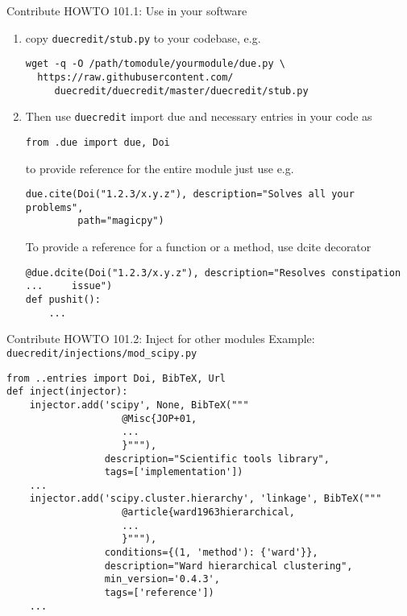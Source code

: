 \begin{frame}[fragile]{Contribute HOWTO 101.1: Use in your software}

\begin{enumerate}
\item copy \texttt{duecredit/stub.py} to your codebase, e.g.
\begin{Verbatim}[fontsize=\scriptsize]
wget -q -O /path/tomodule/yourmodule/due.py \
  https://raw.githubusercontent.com/
     duecredit/duecredit/master/duecredit/stub.py
\end{Verbatim}

\item Then use \texttt{duecredit} import due and necessary entries in your code as

\begin{verbatim}
from .due import due, Doi
\end{verbatim}

to provide reference for the entire module just use e.g.

\begin{verbatim}
due.cite(Doi("1.2.3/x.y.z"), description="Solves all your problems",
         path="magicpy")
\end{verbatim}

To provide a reference for a function or a method, use dcite decorator

\begin{verbatim}
@due.dcite(Doi("1.2.3/x.y.z"), description="Resolves constipation ...     issue")
def pushit():
    ...
\end{verbatim}
\end{enumerate}
\end{frame}

\begin{frame}[fragile]{Contribute HOWTO 101.2: Inject for other modules}
Example: \texttt{duecredit/injections/mod\_scipy.py}

\begin{verbatim}
from ..entries import Doi, BibTeX, Url
def inject(injector):
    injector.add('scipy', None, BibTeX("""
                    @Misc{JOP+01,
                    ...
                    }"""),
                 description="Scientific tools library",
                 tags=['implementation'])
    ...
    injector.add('scipy.cluster.hierarchy', 'linkage', BibTeX("""
                    @article{ward1963hierarchical,
                    ...
                    }"""),
                 conditions={(1, 'method'): {'ward'}},
                 description="Ward hierarchical clustering",
                 min_version='0.4.3',
                 tags=['reference'])
    ...
\end{verbatim}

\end{frame}

